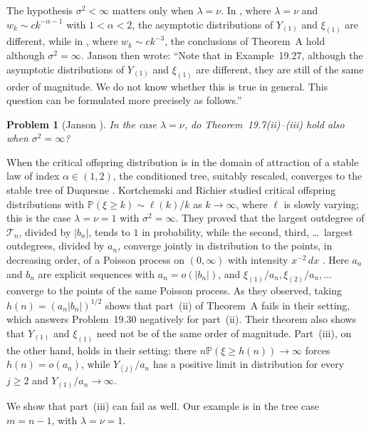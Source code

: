 \documentclass[11pt]{amsart}
\newtheorem*{problem*}{Problem}
\numberwithin{equation}{section}
\newcommand{\Pp}{\mathbb P}
\newcommand{\cT}{\mathcal T}
\begin{document}
The hypothesis $\sigma^2<\infty$ matters only when $\lambda=\nu$. In \cite[Example~19.27]{J12}, where $\lambda=\nu$ and $w_k\sim ck^{-\alpha-1}$ with $1<\alpha<2$, the asymptotic distributions of $Y_{(1)}$ and $\xi_{(1)}$ are different, while in \cite[Example~19.29]{J12}, where $w_k\sim ck^{-3}$, the conclusions of Theorem~A hold although $\sigma^2=\infty$. Janson then wrote: ``Note that in Example~19.27, although the asymptotic distributions of $Y_{(1)}$ and $\xi_{(1)}$ are different, they are still of the same order of magnitude. We do not know whether this is true in general. This question can be formulated more precisely as follows.''

\begin{problem*}[{Janson \cite[Problem~19.30]{J12}}]
In the case $\lambda=\nu$, do Theorem~19.7\textup{(ii)--(iii)} hold also when $\sigma^2=\infty$?
\end{problem*}

When the critical offspring distribution is in the domain of attraction of a stable law of index $\alpha\in(1,2)$, the conditioned tree, suitably rescaled, converges to the stable tree of Duquesne \cite{Duq03}. Kortchemski and Richier \cite{KR19} studied critical offspring distributions with $\Pp(\xi\ge k)\sim\ell(k)/k$ as $k\to\infty$, where $\ell$ is slowly varying; this is the case $\lambda=\nu=1$ with $\sigma^2=\infty$. They proved that the largest outdegree of $\cT_n$, divided by $|b_n|$, tends to $1$ in probability, while the second, third, \dots\ largest outdegrees, divided by $a_n$, converge jointly in distribution to the points, in decreasing order, of a Poisson process on $(0,\infty)$ with intensity $x^{-2}\,dx$ \cite[Theorem~3]{KR19}. Here $a_n$ and $b_n$ are explicit sequences with $a_n=o(|b_n|)$, and $\xi_{(1)}/a_n,\xi_{(2)}/a_n,\dots$ converge to the points of the same Poisson process. As they observed, taking $h(n)=(a_n|b_n|)^{1/2}$ shows that part~(ii) of Theorem~A fails in their setting, which answers Problem~19.30 negatively for part~(ii). Their theorem also shows that $Y_{(1)}$ and $\xi_{(1)}$ need not be of the same order of magnitude. Part~(iii), on the other hand, holds in their setting: there $n\Pp(\xi\ge h(n))\to\infty$ forces $h(n)=o(a_n)$, while $Y_{(j)}/a_n$ has a positive limit in distribution for every $j\ge2$ and $Y_{(1)}/a_n\to\infty$.

We show that part~(iii) can fail as well. Our example is in the tree case $m=n-1$, with $\lambda=\nu=1$.
\end{document}
